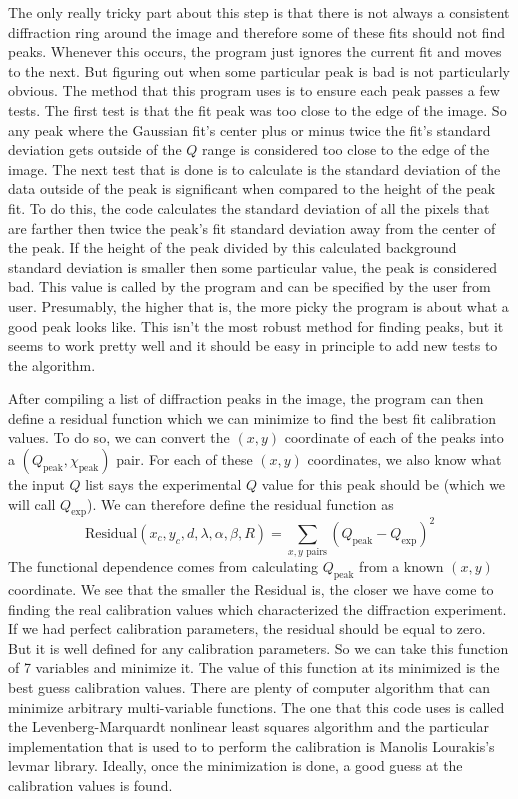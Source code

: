 The only really tricky part about this step is that
there is not always a consistent diffraction ring 
around the image and therefore some of these fits 
should not find peaks. Whenever this occurs, the program
just ignores the current fit and moves to the next. 
But figuring out when some particular peak is bad
is not particularly obvious. The method that this
program uses is to ensure each peak passes a few
tests. The first test is that the fit peak was
too close to the edge of the image. So any peak where
the Gaussian fit's center plus or minus twice the fit's
standard deviation gets outside of the $Q$ range is
considered too close to the edge of the image.
The next test that is done is to calculate is the
standard deviation of the data outside of the peak is
significant when compared to the height of the peak
fit. To do this, the code calculates the standard 
deviation of all the pixels that are farther then twice
the peak's fit standard deviation away from the
center of the peak. If the height of the peak
divided by this calculated background standard deviation
is smaller then some particular value, the peak is
considered bad. This value is called by the program
 and can be specified by the user from user.
Presumably, the higher that  is, the
more picky the program is about what a good peak looks
like. This isn't the most robust method for finding peaks,
but it seems to work pretty well and it should be easy 
in principle to add new tests to the algorithm.

After compiling a list of diffraction peaks in the image,
the program can then define a residual function which
we can minimize to find the best fit calibration values.
To do so, we can convert the $(x,y)$ coordinate
of each of the peaks into a 
$(Q_{\text{peak}},\chi_{\text{peak}})$ pair. 
For each of these $(x,y)$ coordinates, we also
know what the input $Q$ list says the experimental $Q$ 
value for this peak should be (which we will call 
$Q_{\text{exp}}$). We can therefore define
the residual function as
\begin{equation}\label{residual}
    \text{Residual}(x_c,y_c,d,\lambda,\alpha,\beta,R) =  
        \sum_{\text{$x,y$ pairs}}
        (Q_{\text{peak}} - Q_{\text{exp}})^2
\end{equation}
The functional dependence comes from
calculating $Q_{\text{peak}}$ from a known
$(x,y)$ coordinate. We see that the smaller the 
Residual is, the closer we have come to finding 
the real calibration values which characterized
the diffraction experiment. If we had perfect
calibration parameters, the residual should be
equal to zero. But it is well defined for any
calibration parameters. So we can take this 
function of 7 variables and minimize it. 
The value of this function at its minimized 
is the best guess calibration values.
There are plenty of computer algorithm that
can minimize arbitrary multi-variable functions.
The one that this code uses is called the 
Levenberg-Marquardt
nonlinear least squares algorithm
and the particular implementation that is used
to to perform the calibration is Manolis Lourakis's
levmar library\cite{lourakis04LM}. Ideally, 
once the minimization is done, a good guess at the
calibration values is found.

